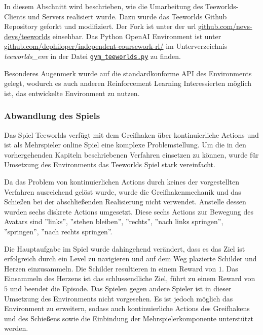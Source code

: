 \documentclass[11pt]{scrartcl}
\begin{document}
In diesem Abschnitt wird beschrieben, wie die Umarbeitung des Teeworlds-Clients und
Servers realisiert wurde. Dazu wurde das Teeworlds Github Repository geforkt und
modifiziert. Der Fork ist unter der url \url{github.com/nevs-devs/teeworlds} einsehbar.
Das Python OpenAI Environment ist unter \url{github.com/dephiloper/independent-coursework-rl/}
im Unterverzeichnis \textit{teeworlds\_env} in der Datei
\href{github.com/dephiloper/independent-coursework-rl/teeworlds_env/gym_teeworlds.py}
{\nolinkurl{gym\_teeworlds.py}} zu finden.

Besonderes Augenmerk wurde auf die standardkonforme API des Environments gelegt, wodurch
es auch anderen Reinforcement Learning Interessierten möglich ist, das entwickelte
Environment zu nutzen.

\subsubsection{Abwandlung des Spiels}
Das Spiel Teeworlds verfügt mit dem Greifhaken über kontinuierliche Actions und ist als
Mehrspieler online Spiel eine komplexe Problemstellung. Um die in den vorhergehenden
Kapiteln beschriebenen Verfahren einsetzen zu können, wurde für Umsetzung des Environments
das Teeworlds Spiel stark vereinfacht.

Da das Problem von kontinuierlichen Actions durch keines der vorgestellten Verfahren
ausreichend gelöst wurde, wurde die Greifhakenmechanik und das Schießen bei der
abschließenden Realisierung nicht verwendet. Anstelle dessen wurden sechs diskrete
Actions umgesetzt. Diese sechs Actions zur Bewegung des Avatars sind ''links'',
''stehen bleiben'', ''rechts'', ''nach links springen'', ''springen'',
''nach rechts springen''.

Die Hauptaufgabe im Spiel wurde dahingehend verändert, dass es das Ziel ist erfolgreich
durch ein Level zu navigieren und auf dem Weg plazierte Schilder und Herzen einzusammeln.
Die Schilder resultieren in einem Reward von $1$. Das Einsammeln des Herzens ist das
schlussendliche Ziel, führt zu einem Reward von $5$ und beendet die Episode. Das Spielen
gegen andere Spieler ist in dieser Umsetzung des Environments nicht vorgesehen. 
Es ist jedoch möglich das Environment zu erweitern, sodass auch kontinuierliche Actions
des Greifhakens und des Schießens sowie die Einbindung der Mehrspielerkomponente
unterstützt werden.
\end{document}

